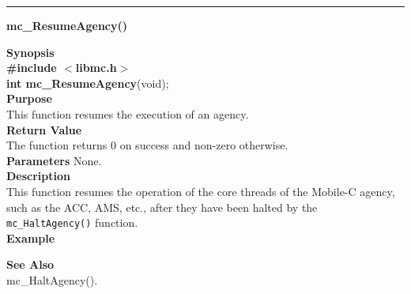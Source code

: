 \noindent
\vspace{5pt}
\rule{6.5in}{0.015in}
\noindent
{}
{\LARGE \bf mc\_ResumeAgency()}\\
\label{api:mc_ResumeAgency()}

\noindent
{\bf Synopsis}\\
{\bf \#include $<$libmc.h$>$}\\
{\bf int mc\_ResumeAgency}({void});\\

\noindent
{\bf Purpose}\\
This function resumes the execution of an agency. \\

\noindent
{\bf Return Value}\\
The function returns 0 on success and non-zero otherwise.\\

\noindent
{\bf Parameters}
None. \\

\noindent
{\bf Description}\\
This function resumes the operation of the core threads of the Mobile-C
agency, such as the ACC, AMS, etc., after they have been halted by the 
\texttt{mc\_HaltAgency()} function.\\

\noindent
{\bf Example}\\
\noindent

\noindent
{\bf See Also}\\
mc\_HaltAgency().

